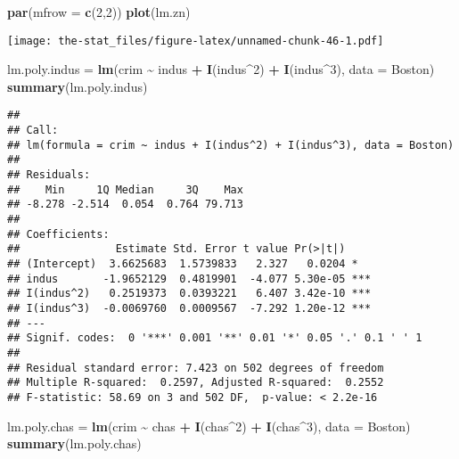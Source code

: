\documentclass[
]{article}
\newenvironment{Shaded}{\begin{snugshade}}{\end{snugshade}}
\newcommand{\AttributeTok}[1]{\textcolor[rgb]{0.13,0.29,0.53}{#1}}
\newcommand{\DecValTok}[1]{\textcolor[rgb]{0.00,0.00,0.81}{#1}}
\newcommand{\FunctionTok}[1]{\textcolor[rgb]{0.13,0.29,0.53}{\textbf{#1}}}
\newcommand{\NormalTok}[1]{#1}
\newcommand{\OtherTok}[1]{\textcolor[rgb]{0.56,0.35,0.01}{#1}}
\newcommand{\SpecialCharTok}[1]{\textcolor[rgb]{0.81,0.36,0.00}{\textbf{#1}}}
\begin{document}
\begin{Shaded}
\begin{Highlighting}[]
\FunctionTok{par}\NormalTok{(}\AttributeTok{mfrow =} \FunctionTok{c}\NormalTok{(}\DecValTok{2}\NormalTok{,}\DecValTok{2}\NormalTok{))}
\FunctionTok{plot}\NormalTok{(lm.zn)}
\end{Highlighting}
\end{Shaded}

\texttt{[image: the-stat\_files/figure-latex/unnamed-chunk-46-1.pdf]}

\begin{Shaded}
\begin{Highlighting}[]
\NormalTok{lm.poly.indus }\OtherTok{=} \FunctionTok{lm}\NormalTok{(crim }\SpecialCharTok{\textasciitilde{}}\NormalTok{ indus }\SpecialCharTok{+} \FunctionTok{I}\NormalTok{(indus}\SpecialCharTok{\^{}}\DecValTok{2}\NormalTok{) }\SpecialCharTok{+} \FunctionTok{I}\NormalTok{(indus}\SpecialCharTok{\^{}}\DecValTok{3}\NormalTok{), }\AttributeTok{data =}\NormalTok{ Boston)}
\FunctionTok{summary}\NormalTok{(lm.poly.indus)}
\end{Highlighting}
\end{Shaded}

\begin{verbatim}
## 
## Call:
## lm(formula = crim ~ indus + I(indus^2) + I(indus^3), data = Boston)
## 
## Residuals:
##    Min     1Q Median     3Q    Max 
## -8.278 -2.514  0.054  0.764 79.713 
## 
## Coefficients:
##               Estimate Std. Error t value Pr(>|t|)    
## (Intercept)  3.6625683  1.5739833   2.327   0.0204 *  
## indus       -1.9652129  0.4819901  -4.077 5.30e-05 ***
## I(indus^2)   0.2519373  0.0393221   6.407 3.42e-10 ***
## I(indus^3)  -0.0069760  0.0009567  -7.292 1.20e-12 ***
## ---
## Signif. codes:  0 '***' 0.001 '**' 0.01 '*' 0.05 '.' 0.1 ' ' 1
## 
## Residual standard error: 7.423 on 502 degrees of freedom
## Multiple R-squared:  0.2597, Adjusted R-squared:  0.2552 
## F-statistic: 58.69 on 3 and 502 DF,  p-value: < 2.2e-16
\end{verbatim}

\begin{Shaded}
\begin{Highlighting}[]
\NormalTok{lm.poly.chas }\OtherTok{=} \FunctionTok{lm}\NormalTok{(crim }\SpecialCharTok{\textasciitilde{}}\NormalTok{ chas }\SpecialCharTok{+} \FunctionTok{I}\NormalTok{(chas}\SpecialCharTok{\^{}}\DecValTok{2}\NormalTok{) }\SpecialCharTok{+} \FunctionTok{I}\NormalTok{(chas}\SpecialCharTok{\^{}}\DecValTok{3}\NormalTok{), }\AttributeTok{data =}\NormalTok{ Boston)}
\FunctionTok{summary}\NormalTok{(lm.poly.chas)}
\end{Highlighting}
\end{Shaded}
\end{document}

